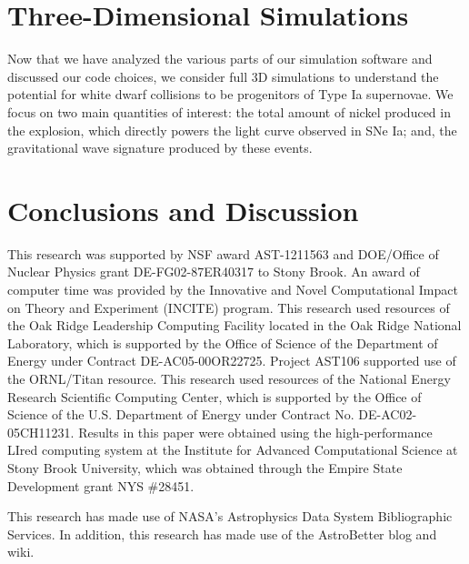 \documentclass[twocolumn,numberedappendix]{../aastex6}
\begin{document}
\section{Three-Dimensional Simulations}
\label{sec:3D}

Now that we have analyzed the various parts of our simulation software and
discussed our code choices, we consider full 3D simulations to understand
the potential for white dwarf collisions to be progenitors of Type Ia
supernovae. We focus on two main quantities of interest: the total amount of
nickel produced in the explosion, which directly powers the light curve
observed in SNe Ia; and, the gravitational wave signature produced by
these events.


\section{Conclusions and Discussion}\label{Sec:Conclusions and Discussion}
\label{sec:conclusion}


\acknowledgments

This research was supported by NSF award AST-1211563 and DOE/Office of
Nuclear Physics grant DE-FG02-87ER40317 to Stony Brook. An award of
computer time was provided by the Innovative and Novel Computational
Impact on Theory and Experiment (INCITE) program.  This research used
resources of the Oak Ridge Leadership Computing Facility located in
the Oak Ridge National Laboratory, which is supported by the Office of
Science of the Department of Energy under Contract
DE-AC05-00OR22725. Project AST106 supported use of the ORNL/Titan
resource.  This research used resources of the National Energy
Research Scientific Computing Center, which is supported by the Office
of Science of the U.S. Department of Energy under Contract
No. DE-AC02-05CH11231.  Results in this paper were obtained using the
high-performance LIred computing system at the Institute for Advanced
Computational Science at Stony Brook University, which was obtained
through the Empire State Development grant NYS \#28451.

This research has made use of NASA's Astrophysics Data System 
Bibliographic Services. In addition, this research has made use
of the AstroBetter blog and wiki.

\clearpage



\end{document}
